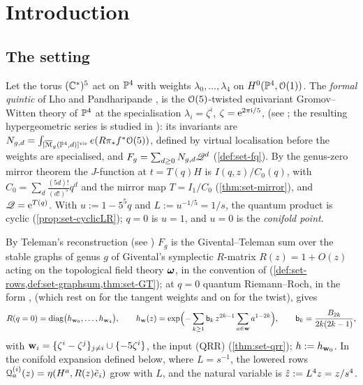 \section{Introduction}
\label{sec:int}

\subsection{The setting}
\label{sec:int-setting}

Let the torus $(\mathbb{C}^*)^5$ act on $\mathbb{P}^4$ with weights $\lambda_0,\dots,\lambda_4$ on $H^0(\mathbb{P}^4,\mathcal{O}(1))$. The \emph{formal quintic} of Lho and Pandharipande \cite[\S0.2, (5)]{LP18}, \cite[\S0.2, (5)]{LP20} is the $\mathcal{O}(5)$-twisted equivariant Gromov--Witten theory of $\mathbb{P}^4$ at the specialisation $\lambda_i=\zeta^i$, $\zeta=\mathrm{e}^{2\pi\mathrm{i}/5}$, (see \cite[\S3.1; \S3.2, (9)]{GJR18}; the resulting hypergeometric series is studied in \cite{ZZ08}): its invariants are $N_{g,d}=\int_{[\overline{\mathcal M}_g(\mathbb{P}^4,d)]^{\mathrm{vir}}}e(R\pi_*f^*\mathcal{O}(5))$, defined by virtual localisation \cite{MR1666787} before the weights are specialised, and $F_g=\sum_{d\geq0}N_{g,d}\mathscr{Q}^d$ (\cref{def:set-fq}). By the genus-zero mirror theorem the $J$-function at $t=T(q)H$ is $I(q,z)/C_0(q)$, with $C_0=\sum_d\frac{(5d)!}{(d!)^5}q^d$ and the mirror map $T=I_1/C_0$ (\cref{thm:set-mirror}), and $\mathscr{Q}=\mathrm{e}^{T(q)}$. With $u:=1-5^5q$ and $L:=u^{-1/5}=1/s$, the quantum product is cyclic (\cref{prop:set-cyclicLR}); $q=0$ is $u=1$, and $u=0$ is the \emph{conifold point}.

By Teleman's reconstruction \cite[Theorem~(2) in (1.15)]{MR2917177} (see \cite[\S4.1, Theorem~4.1]{GJR18}) $F_g$ is the Givental--Teleman sum over the stable graphs of genus $g$ of Givental's symplectic $R$-matrix $R(z)=1+O(z)$ acting on the topological field theory $\boldsymbol{\omega}$, in the convention of \cite[Defs.~2.2, 2.13]{PPZ15} (\cref{def:set-rows,def:set-graphsum,thm:set-GT}); at $q=0$ quantum Riemann--Roch, in the form \cite[(17)]{GJR18}, \cite[(19)--(20)]{GJR17} (which rest on \cite[\S2.2, Theorem~1]{Giv01} for the tangent weights and on \cite[Corollary~1]{MR2276766} for the twist), gives
\[
R(q=0)=\operatorname{diag}\bigl(h_{\mathbf{w}_0},\dots,h_{\mathbf{w}_4}\bigr),\qquad h_{\mathbf{w}}(z)=\exp\Bigl(-\sum_{k\geq1}\mathsf{b}_k\,z^{2k-1}\sum_{a\in\mathbf{w}}a^{1-2k}\Bigr),\qquad \mathsf{b}_k=\frac{B_{2k}}{2k(2k-1)},
\]
with $\mathbf{w}_i=\{\zeta^i-\zeta^j\}_{j\neq i}\cup\{-5\zeta^i\}$, the input (QRR) (\cref{thm:set-qrr}); $h:=h_{\mathbf{w}_0}$. In the conifold expansion defined below, where $L=s^{-1}$, the lowered rows $\mathcal{Q}^{(i)}_a(z)=\eta(H^a,R(z)\tilde e_i)$ grow with $L$, and the natural variable is $\hat{z}:=L^4z=z/s^4$.

